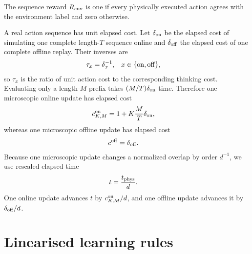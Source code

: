 \documentclass{article}
\begin{document}
The sequence reward $R_{\rm env}$ is one if every physically executed action agrees with the environment label and zero otherwise.

A real action sequence has unit elapsed cost. Let $\delta_{\rm on}$ be the elapsed cost of simulating one complete length-$T$ sequence online and $\delta_{\rm off}$ the elapsed cost of one complete offline replay. Their inverses are
\begin{align}
\tau_x &= \delta_x^{-1}, & x &\in\{{\rm on},{\rm off}\},
\end{align}
so $\tau_x$ is the ratio of unit action cost to the corresponding thinking cost. Evaluating only a length-$M$ prefix takes $(M/T)\delta_{\rm on}$ time. Therefore one microscopic online update has elapsed cost
\begin{align}
c_{K,M}^{\rm on} &= 1+K\frac{M}{T}\delta_{\rm on},
\end{align}
whereas one microscopic offline update has elapsed cost
\begin{align}
c^{\rm off} &= \delta_{\rm off}.
\end{align}
Because one microscopic update changes a normalized overlap by order $d^{-1}$, we use rescaled elapsed time
\begin{align}
t &= \frac{t_{\rm phys}}{d}.
\end{align}
One online update advances $t$ by $c_{K,M}^{\rm on}/d$, and one offline update advances it by $\delta_{\rm off}/d$.

\section{Linearised learning rules}
\end{document}
